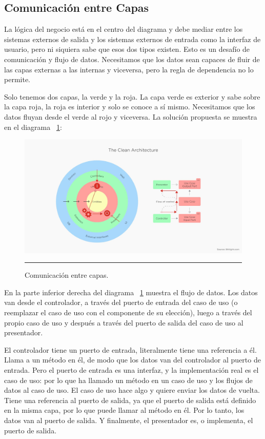 \subsection{Comunicación entre Capas}
La lógica del negocio está en el centro del diagrama y debe mediar entre los sistemas externos de salida y los sistemas externos de entrada como la interfaz de usuario, pero ni siquiera sabe que esos dos tipos existen. Esto es un desafío  de comunicación y flujo de datos. Necesitamos que los datos sean capaces de fluir de las capas externas a las internas y viceversa, pero la regla de dependencia no lo permite.

Solo tenemos dos capas, la verde y la roja. La capa verde es exterior y sabe sobre la capa roja, la roja es interior y solo se conoce a sí mismo. Necesitamos que los datos fluyan desde el verde al rojo y viceversa. La solución propuesta se muestra en el diagrama ~\ref{fig:C2_CC_01}:

\begin{figure}[htbp]
	\centering
	\includegraphics[width=1\textwidth]{Figures/-004.png}
	\rule{35em}{1pt}
	\caption[Layer Communication]{Comunicación entre capas.}
	\label{fig:C2_CC_01}
\end{figure}

En la parte inferior derecha del diagrama ~\ref{fig:C2_CC_01} muestra el flujo de datos. Los datos van desde el controlador, a través del puerto de entrada del caso de uso (o reemplazar el caso de uso con el componente de su elección), luego a través del propio caso de uso y después a través del puerto de salida del caso de uso al presentador.

El controlador tiene un puerto de entrada, literalmente tiene una referencia a él. Llama a un método en él, de modo que los datos van del controlador al puerto de entrada. Pero el puerto de entrada es una interfaz, y la implementación real es el caso de uso: por lo que ha llamado un método en un caso de uso y los flujos de datos al caso de uso. El caso de uso hace algo y quiere enviar los datos de vuelta. Tiene una referencia al puerto de salida, ya que el puerto de salida está definido en la misma capa, por lo que puede llamar al método en él. Por lo tanto, los datos van al puerto de salida. Y finalmente, el presentador es, o implementa, el puerto de salida.
